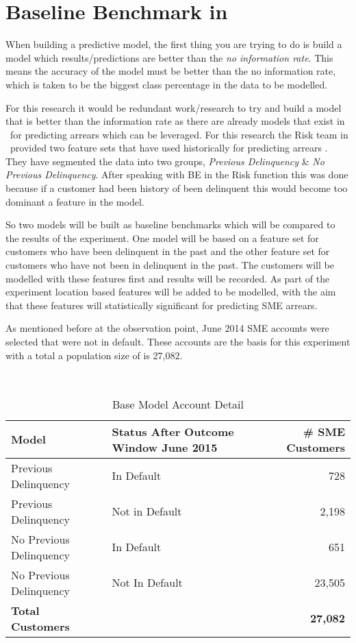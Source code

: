 \section{Baseline Benchmark in \subjectname\ }
When building a predictive model, the first thing you are trying to do is build a model which results/predictions are better than the \textit{no information rate}. This means the accuracy of the model must be better than the no information rate, which is taken to be the biggest class percentage in the data to be modelled.

For this research it would be redundant work/research to try and build a model that is better than the information rate as there are already models that exist in \subjectname\ for predicting arrears which can be leveraged. For this research the Risk team in \subjectname\ provided two feature sets that have used historically for predicting arrears \subjectname. They have segmented the data into two groups, \textit{Previous Delinquency} \& \textit{No Previous Delinquency}. After speaking with BE in the Risk function this was done because if a customer had been history of been delinquent this would become too dominant a feature in the model.

So two models will be built as baseline benchmarks which will be compared to the results of the experiment. One model will be based on a feature set for customers who have been delinquent in the past and the other feature set for customers who have not been in delinquent in the past. The customers will be modelled with these features first and results will be recorded. As part of the experiment location based features will be added to be modelled, with the aim that these features will statistically significant for predicting SME arrears. 

As mentioned before at the observation point, June 2014 SME accounts were selected that were not in default. These accounts are the basis for this experiment with a total a population size of is 27,082. 


\begin{table}[H]
	\centering\
	\resizebox{\textwidth}{!}
	{
	\begin{tabular}{l| l| r}
		\hline
		\textbf{Model} & \textbf{Status After Outcome Window June 2015} & \textbf{\# SME Customers} \\
		\hline
		Previous Delinquency          & In Default        & 728 \\
		Previous Delinquency          & Not in Default        & 2,198 \\ \hline
		No Previous Delinquency          & In Default        & 651 \\ 
		No Previous Delinquency          & Not In Default        & 23,505 \\
		\hline
		\textbf{Total Customers}         &         & \textbf{27,082} \\ \hline
	\end{tabular}
	}
	\caption{Base Model Account Detail}
\end{table}

